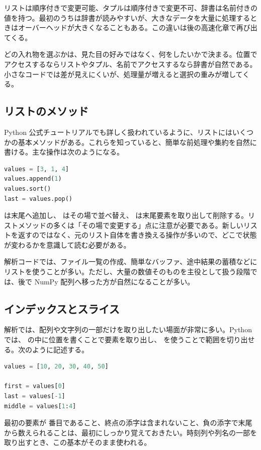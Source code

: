 リストは順序付きで変更可能、タプルは順序付きで変更不可、辞書は名前付きの値を持つ。最初のうちは辞書が読みやすいが、大きなデータを大量に処理するときはオーバーヘッドが大きくなることもある。この違いは後の高速化章で再び出てくる。

どの入れ物を選ぶかは、見た目の好みではなく、何をしたいかで決まる。位置でアクセスするならリストやタプル、名前でアクセスするなら辞書が自然である。小さなコードでは差が見えにくいが、処理量が増えると選択の重みが増してくる。

\subsection{リストのメソッド}

Python 公式チュートリアルでも詳しく扱われているように、リストにはいくつかの基本メソッドがある。これらを知っていると、簡単な前処理や集約を自然に書ける。主な操作は次のようになる。

\begin{lstlisting}[language=Python]
values = [3, 1, 4]
values.append(1)
values.sort()
last = values.pop()
\end{lstlisting}

 は末尾へ追加し、 はその場で並べ替え、 は末尾要素を取り出して削除する。リストメソッドの多くは「その場で変更する」点に注意が必要である。新しいリストを返すのではなく、元のリスト自体を書き換える操作が多いので、どこで状態が変わるかを意識して読む必要がある。

解析コードでは、ファイル一覧の作成、簡単なバッファ、途中結果の蓄積などにリストを使うことが多い。ただし、大量の数値そのものを主役として扱う段階では、後で NumPy 配列へ移った方が自然になることが多い。

\subsection{インデックスとスライス}

解析では、配列や文字列の一部だけを取り出したい場面が非常に多い。Python では、\code{[]} の中に位置を書くことで要素を取り出し、\code{:} を使うことで範囲を切り出せる。次のように記述する。

\begin{lstlisting}[language=Python]
values = [10, 20, 30, 40, 50]

first = values[0]
last = values[-1]
middle = values[1:4]
\end{lstlisting}

最初の要素が  番目であること、終点の添字は含まれないこと、負の添字で末尾から数えられることは、最初にしっかり覚えておきたい。時刻列や列名の一部を取り出すとき、この基本がそのまま使われる。

